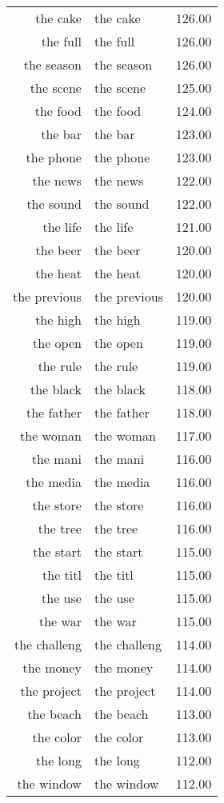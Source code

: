 \begin{table}[ht]
\begin{tabular}{rlr}
  the cake & the cake & 126.00 \\ 
  the full & the full & 126.00 \\ 
  the season & the season & 126.00 \\ 
  the scene & the scene & 125.00 \\ 
  the food & the food & 124.00 \\ 
  the bar & the bar & 123.00 \\ 
  the phone & the phone & 123.00 \\ 
  the news & the news & 122.00 \\ 
  the sound & the sound & 122.00 \\ 
  the life & the life & 121.00 \\ 
  the beer & the beer & 120.00 \\ 
  the heat & the heat & 120.00 \\ 
  the previous & the previous & 120.00 \\ 
  the high & the high & 119.00 \\ 
  the open & the open & 119.00 \\ 
  the rule & the rule & 119.00 \\ 
  the black & the black & 118.00 \\ 
  the father & the father & 118.00 \\ 
  the woman & the woman & 117.00 \\ 
  the mani & the mani & 116.00 \\ 
  the media & the media & 116.00 \\ 
  the store & the store & 116.00 \\ 
  the tree & the tree & 116.00 \\ 
  the start & the start & 115.00 \\ 
  the titl & the titl & 115.00 \\ 
  the use & the use & 115.00 \\ 
  the war & the war & 115.00 \\ 
  the challeng & the challeng & 114.00 \\ 
  the money & the money & 114.00 \\ 
  the project & the project & 114.00 \\ 
  the beach & the beach & 113.00 \\ 
  the color & the color & 113.00 \\ 
  the long & the long & 112.00 \\ 
  the window & the window & 112.00 \\ 

\end{tabular}
\end{table}
